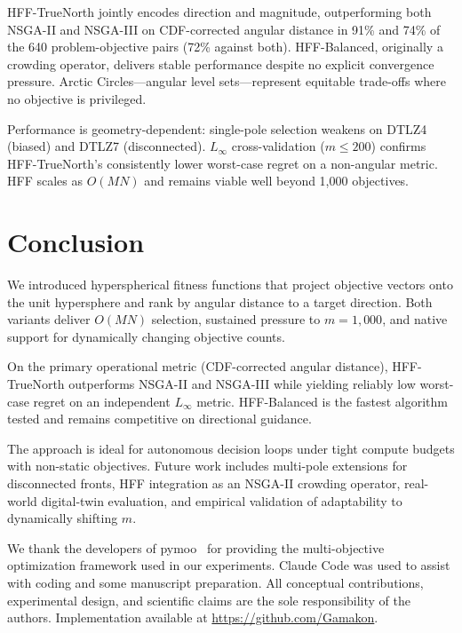\documentclass[sigconf]{acmart}
\begin{document}
HFF-TrueNorth jointly encodes direction and magnitude, outperforming both NSGA-II and NSGA-III on CDF-corrected angular distance in 91\% and 74\% of the 640 problem-objective pairs (72\% against both). HFF-Balanced, originally a crowding operator, delivers stable performance despite no explicit convergence pressure. Arctic Circles---angular level sets---represent equitable trade-offs where no objective is privileged.

Performance is geometry-dependent: single-pole selection weakens on DTLZ4 (biased) and DTLZ7 (disconnected). $L_\infty$ cross-validation ($m \leq 200$) confirms HFF-TrueNorth's consistently lower worst-case regret on a non-angular metric. HFF scales as $O(MN)$ and remains viable well beyond 1,000 objectives.


\section{Conclusion}
\label{sec:conclusion}

We introduced hyperspherical fitness functions that project objective vectors onto the unit hypersphere and rank by angular distance to a target direction. Both variants deliver $O(MN)$ selection, sustained pressure to $m = 1{,}000$, and native support for dynamically changing objective counts.

On the primary operational metric (CDF-corrected angular distance), HFF-TrueNorth outperforms NSGA-II and NSGA-III while yielding reliably low worst-case regret on an independent $L_\infty$ metric. HFF-Balanced is the fastest algorithm tested and remains competitive on directional guidance.

The approach is ideal for autonomous decision loops under tight compute budgets with non-static objectives. Future work includes multi-pole extensions for disconnected fronts, HFF integration as an NSGA-II crowding operator, real-world digital-twin evaluation, and empirical validation of adaptability to dynamically shifting $m$.

\begin{acks}
We thank the developers of pymoo~\cite{blank2020pymoo} for providing the multi-objective optimization framework used in our experiments. Claude Code was used to assist with coding and some manuscript preparation. All conceptual contributions, experimental design, and scientific claims are the sole responsibility of the authors. Implementation available at \url{https://github.com/Gamakon}.
\end{acks}
\end{document}
